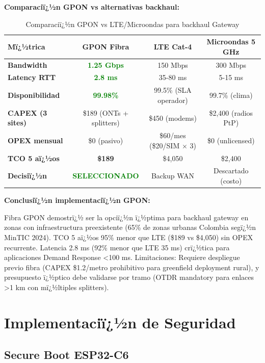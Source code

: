 \textbf{Comparaciï¿½n GPON vs alternativas backhaul:}

\begin{table}[H]
\centering
\caption{Comparaciï¿½n GPON vs LTE/Microondas para backhaul Gateway}
\label{tab:impl-gpon-comparison}
\small
\begin{tabular}{|l|c|c|c|}
\hline
\rowcolor{gray!20}
\textbf{Mï¿½trica} & \textbf{GPON Fibra} & \textbf{LTE Cat-4} & \textbf{Microondas 5 GHz} \\
\hline
\textbf{Bandwidth} & \textcolor{green}{\textbf{1.25 Gbps}} & 150 Mbps & 300 Mbps \\
\hline
\textbf{Latency RTT} & \textcolor{green}{\textbf{2.8 ms}} & 35-80 ms & 5-15 ms \\
\hline
\textbf{Disponibilidad} & \textcolor{green}{\textbf{99.98\%}} & 99.5\% (SLA operador) & 99.7\% (clima) \\
\hline
\textbf{CAPEX (3 sites)} & \$189 (ONTs + splitters) & \$450 (modems) & \$2,400 (radios PtP) \\
\hline
\textbf{OPEX mensual} & \$0 (pasivo) & \$60/mes (\$20/SIM $\times$ 3) & \$0 (unlicensed) \\
\hline
\textbf{TCO 5 aï¿½os} & \textbf{\$189} & \$4,050 & \$2,400 \\
\hline
\textbf{Decisiï¿½n} & \textcolor{green}{\textbf{SELECCIONADO}} & Backup WAN & Descartado (costo) \\
\hline
\end{tabular}
\end{table}

\textbf{Conclusiï¿½n implementaciï¿½n GPON:}

Fibra GPON demostrï¿½ ser la opciï¿½n ï¿½ptima para backhaul gateway en zonas con infraestructura preexistente (65\% de zonas urbanas Colombia segï¿½n MinTIC 2024). TCO 5 aï¿½os 95\% menor que LTE (\$189 vs \$4,050) sin OPEX recurrente. Latencia 2.8 ms (92\% menor que LTE 35 ms) crï¿½tica para aplicaciones Demand Response <100 ms. Limitaciones: Requiere despliegue previo fibra (CAPEX \$1.2/metro prohibitivo para greenfield deployment rural), y presupuesto ï¿½ptico debe validarse por tramo (OTDR mandatory para enlaces >1 km con mï¿½ltiples splitters).

\section{Implementaciï¿½n de Seguridad}
\label{sec:impl-seguridad}

\subsection{Secure Boot ESP32-C6}

